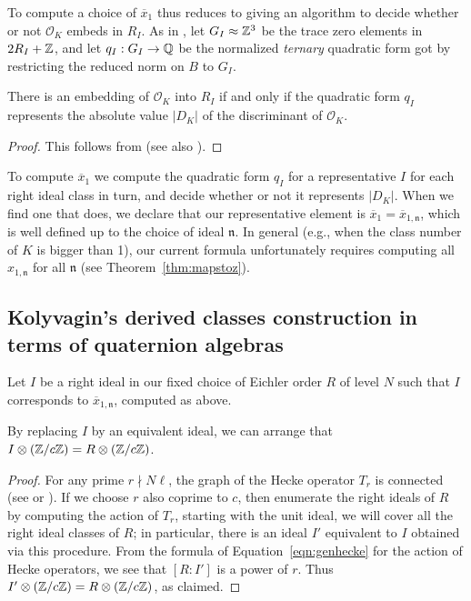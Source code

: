 \documentclass{article} \usepackage[active]{srcltx}
\newcommand{\n}{\mathfrak{n}}
\renewcommand{\O}{\mathcal{O}}
\begin{document}
To compute a choice of $\overline{x}_1$ thus reduces to giving an
algorithm to decide whether or not $\O_K$ embeds in $R_I$.  As in
\cite[pg.~172]{gross:heights_and_special_values}, let $G_I\approx
\mathbb{Z}^3$ be the trace zero elements in $2R_I + \mathbb{Z}$, and let $q_I:G_I\to
\mathbb{Q}$ be the normalized {\em ternary} quadratic form got by restricting the
reduced norm on $B$ to $G_I$.
\begin{lemma}
  There is an embedding of $\O_K$ into $R_I$ if and only if the
  quadratic form $q_I$ represents the absolute value $|D_K|$ of the
  discriminant of $\O_K$.
\end{lemma}
\begin{proof}
This follows from \cite[Prop.~12.9]{gross:heights_and_special_values} 
(see also \cite[Lem.~4.1]{jetchev-kane:equi}).
\end{proof}
To compute $\overline{x}_1$ we compute the quadratic form $q_I$ for a
representative $I$ for each right ideal class in turn, and decide
whether or not it represents $|D_K|$.  When we find one that does, we
declare that our representative element is $\overline{x}_1 =
\overline{x}_{1,\n}$, which is well defined up to the choice of ideal
$\n$.  In general (e.g., when the class number of $K$ is bigger than
1), our current formula unfortunately requires computing all
$x_{1,\n}$ for all $\n$ (see Theorem~\ref{thm:mapstoz}).

\subsection{Kolyvagin's derived classes construction in terms of quaternion algebras}\label{sec:kolyderiv}

Let $I$ be a right ideal in our fixed choice of Eichler order $R$ of
level $N$ such that $I$ corresponds to $\overline{x}_{1,\n}$, computed
as above.

\begin{lemma}\label{lem:bestI}
  By replacing $I$ by an equivalent ideal, we can arrange that
  $I\otimes(\mathbb{Z}/c\mathbb{Z})=R\otimes (\mathbb{Z}/c\mathbb{Z})$.
\end{lemma}
\begin{proof}
  For any prime $r\nmid N\ell$, the graph of the Hecke
  operator $T_r$ is connected (see \cite[\S2.4,
  pg.~223]{mestre:graphs} or \cite[Lem.~3.17]{ribet:modreps}).  If we
  choose  $r$ also coprime to $c$, then enumerate the right
  ideals of $R$ by computing the action of $T_r$, starting with the
  unit ideal, we will cover all the right ideal classes of $R$; in
  particular, there is an ideal $I'$ equivalent to $I$ obtained via
  this procedure.  From the formula of Equation~\eqref{eqn:genhecke}
  for the action of Hecke operators, we see that $[R:I']$ is a power
  of $r$.  Thus $I'\otimes(\mathbb{Z}/c\mathbb{Z}) = R\otimes(\mathbb{Z}/c\mathbb{Z})$, as claimed.
\end{proof}
\end{document}
